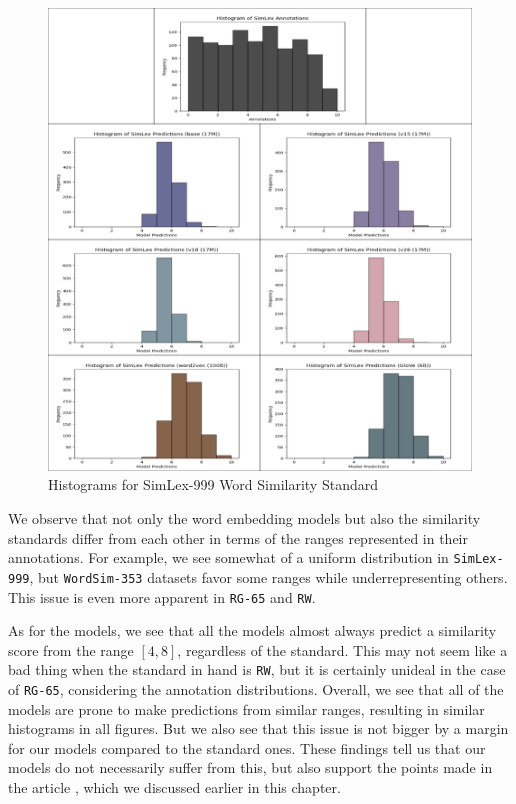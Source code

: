 \begin{figure}[p]
    \centering
    \includegraphics[width=1.0\textwidth]{img/simlex-table.PNG}
    \caption{Histograms for SimLex-999 Word Similarity Standard}
    \label{fig:simlex_table}
\end{figure}


We observe that not only the word embedding models but also the similarity standards differ from each other in terms of the ranges represented in their annotations. For example, we see somewhat of a uniform distribution in \verb|SimLex-999|, but \verb|WordSim-353| datasets favor some ranges while underrepresenting others. This issue is even more apparent in \verb|RG-65| and \verb|RW|. 

As for the models, we see that all the models almost always predict a similarity score from the range $[4, 8]$, regardless of the standard. This may not seem like a bad thing when the standard in hand is \verb|RW|, but it is certainly unideal in the case of \verb|RG-65|, considering the annotation distributions. Overall, we see that all of the models are prone to make predictions from similar ranges, resulting in similar histograms in all figures. But we also see that this issue is not bigger by a margin for our models compared to the standard ones. These findings tell us that our models do not necessarily suffer from this, but also support the points made in the article \cite{sim-problems}, which we discussed earlier in this chapter.


